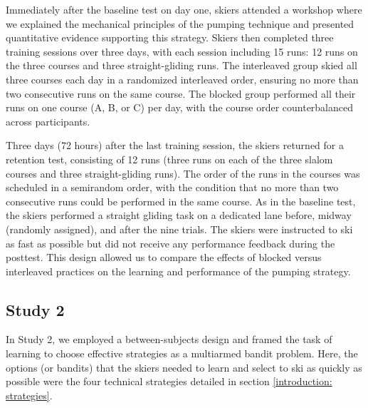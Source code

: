 Immediately after the baseline test on day one, skiers attended a workshop where we explained the mechanical principles of the pumping technique and presented quantitative evidence supporting this strategy. Skiers then completed three training sessions over three days, with each session including 15 runs: 12 runs on the three courses and three straight-gliding runs. The interleaved group skied all three courses each day in a randomized interleaved order, ensuring no more than two consecutive runs on the same course. The blocked group performed all their runs on one course (A, B, or C) per day, with the course order counterbalanced across participants. 

Three days (72 hours) after the last training session, the skiers returned for a retention test, consisting of 12 runs (three runs on each of the three slalom courses and three straight-gliding runs). The order of the runs in the courses was scheduled in a semirandom order, with the condition that no more than two consecutive runs could be performed in the same course. As in the baseline test, the skiers performed a straight gliding task on a dedicated lane before, midway (randomly assigned), and after the nine trials. The skiers were instructed to ski as fast as possible but did not receive any performance feedback during the posttest. This design allowed us to compare the effects of blocked versus interleaved practices on the learning and performance of the pumping strategy. 


 \subsection{Study 2}
In Study 2, we employed a between-subjects design and framed the task of learning to choose effective strategies as a multiarmed bandit problem\cite{sutton_reinforcement_2018}. Here, the options (or bandits) that the skiers needed to learn and select to ski as quickly as possible were the four technical strategies detailed in section \ref{introduction: strategies}.

